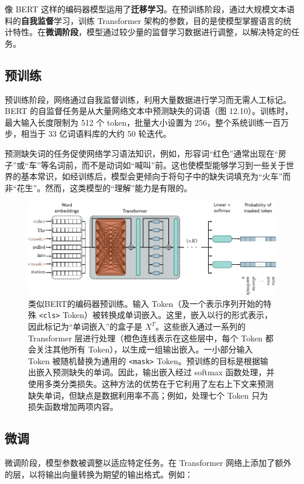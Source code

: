\documentclass[lang=cn,newtx,10pt,scheme=chinese]{elegantbook}
\begin{document}
像 BERT 这样的编码器模型运用了\textbf{迁移学习}。在预训练阶段，通过大规模文本语料的\textbf{自我监督}学习，训练 Transformer 架构的参数，目的是使模型掌握语言的统计特性。在\textbf{微调阶段}，模型通过较少量的监督学习数据进行调整，以解决特定的任务。

\subsection{预训练}
预训练阶段，网络通过自我监督训练，利用大量数据进行学习而无需人工标记。BERT 的自监督任务是从大量网络文本中预测缺失的词语（图 12.10）。训练时，最大输入长度限制为 512 个 token，批量大小设置为 256，整个系统训练一百万步，相当于 33 亿词语料库的大约 50 轮迭代。

预测缺失词的任务促使网络学习语法知识，例如，形容词“红色”通常出现在“房子”或“车”等名词前，而不是动词如“喊叫”前。这也使模型能够学习到一些关于世界的基本常识，如经训练后，模型会更倾向于将句子中的缺失词填充为“火车”而非“花生”。然而，这类模型的“理解”能力是有限的。

\begin{figure}[ht!]
\centering
\includegraphics[width=0.7\linewidth]{PDFFigures/UDLChap12PDF/TransformerEncoder.pdf}
\caption{类似BERT的编码器预训练。输入 Token（及一个表示序列开始的特殊 \texttt{\textless cls\textgreater} Token）被转换成单词嵌入。这里，嵌入以行的形式表示，因此标记为“单词嵌入”的盒子是 $X^T$。这些嵌入通过一系列的 Transformer 层进行处理（橙色连线表示在这些层中，每个 Token 都会关注其他所有 Token），以生成一组输出嵌入。一小部分输入 Token 被随机替换为通用的 \texttt{\textless mask\textgreater} Token。预训练的目标是根据输出嵌入预测缺失的单词。因此，输出嵌入经过 softmax 函数处理，并使用多类分类损失。这种方法的优势在于它利用了左右上下文来预测缺失单词，但缺点是数据利用率不高；例如，处理七个 Token 只为损失函数增加两项内容。}
\end{figure}


\subsection{微调}

微调阶段，模型参数被调整以适应特定任务。在 Transformer 网络上添加了额外的层，以将输出向量转换为期望的输出格式。例如：
\end{document}
